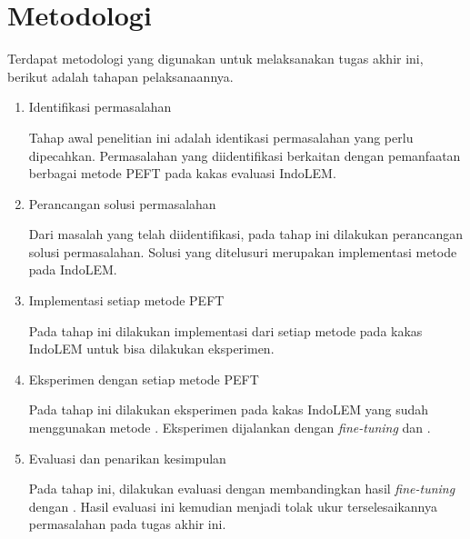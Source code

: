 \section{Metodologi}

Terdapat metodologi yang digunakan untuk melaksanakan tugas akhir ini, berikut adalah tahapan pelaksanaannya.

\begin{enumerate}
    \item Identifikasi permasalahan

    Tahap awal penelitian ini adalah identikasi permasalahan yang perlu dipecahkan. Permasalahan yang diidentifikasi berkaitan dengan pemanfaatan berbagai metode PEFT pada kakas evaluasi IndoLEM.

    \item Perancangan solusi permasalahan

    Dari masalah yang telah diidentifikasi, pada tahap ini dilakukan perancangan solusi permasalahan. Solusi yang ditelusuri merupakan implementasi metode \PEFT pada IndoLEM.

    \item Implementasi setiap metode PEFT

    Pada tahap ini dilakukan implementasi dari setiap metode \PEFT pada kakas IndoLEM untuk bisa dilakukan eksperimen.

    \item Eksperimen dengan setiap metode PEFT

    Pada tahap ini dilakukan eksperimen pada kakas IndoLEM yang sudah menggunakan metode \PEFT. Eksperimen  dijalankan dengan \textit{fine-tuning}  dan \PEFT.

    \item Evaluasi dan penarikan kesimpulan

    Pada tahap ini, dilakukan evaluasi dengan membandingkan hasil \textit{fine-tuning}  dengan \PEFT. Hasil evaluasi ini kemudian  menjadi tolak ukur terselesaikannya permasalahan pada tugas akhir ini.

\end{enumerate}
